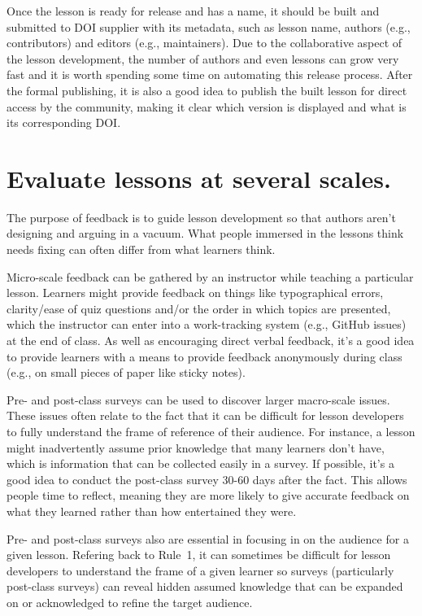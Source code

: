\documentclass[10pt,letterpaper]{article}
\newcommand{\rulemajor}[1]{\section{#1}}
\begin{document}
Once the lesson is ready for release and has a name,
it should be built
and submitted to DOI supplier with its metadata,
such as lesson name, authors (e.g., contributors) and editors (e.g., maintainers).
Due to the collaborative aspect of the lesson development,
the number of authors and even lessons can grow very fast
and it is worth spending some time on automating this release process.
After the formal publishing,
it is also a good idea to publish the built lesson for direct access by the community,
making it clear which version is displayed and what is its corresponding DOI.

\rulemajor{Evaluate lessons at several scales.}

The purpose of feedback is to guide lesson development
so that authors aren't designing and arguing in a vacuum.
What people immersed in the lessons think needs fixing
can often differ from what learners think.

Micro-scale feedback can be gathered by an instructor while teaching a particular lesson.
Learners might provide feedback on things like typographical errors,
clarity/ease of quiz questions and/or the order in which topics are presented,
which the instructor can enter into a work-tracking system (e.g., GitHub issues) at the end of class.
As well as encouraging direct verbal feedback,
it's a good idea to provide learners with a means to provide feedback anonymously during class
(e.g., on small pieces of paper like sticky notes).

Pre- and post-class surveys can be used to discover larger macro-scale issues.
These issues often relate to the fact that it can be difficult for lesson developers
to fully understand the frame of reference of their audience.
For instance, a lesson might inadvertently assume prior knowledge that many learners don't have,
which is information that can be collected easily in a survey.
If possible, it's a good idea to conduct the post-class survey 30-60 days after the fact.
This allows people time to reflect,
meaning they are more likely to give accurate feedback on what they learned
rather than how entertained they were.

Pre- and post-class surveys also are essential in focusing in on the audience for a given lesson.
Refering back to Rule~1,
it can sometimes be difficult for lesson developers to understand the frame of a given learner
so surveys (particularly post-class surveys) can reveal hidden assumed knowledge
that can be expanded on or acknowledged to refine the target audience.
\end{document}
